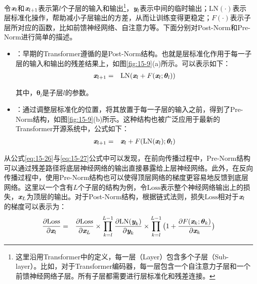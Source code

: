 \parinterval 令$\textbf{\em x}_l$和$\textbf{\em x}_{l+1}$表示第$l$个子层的输入和输出\footnote[4]{这里沿用Transformer中的定义，每一层（Layer）包含多个子层（Sub-layer）。比如，对于Transformer编码器，每一层包含一个自注意力子层和一个前馈神经网络子层。所有子层都需要进行层标准化和残差连接。}，$\textbf{\em y}_l$表示中间的临时输出；$\textrm{LN}(\cdot)$表示层标准化操作，帮助减小子层输出的方差，从而让训练变得更稳定；$F(\cdot)$表示子层所对应的函数，比如前馈神经网络、自注意力等。下面分别对Post-Norm和Pre-Norm进行简单的描述。
\begin{itemize}
\vspace{0.5em}
\item {\small{}}：早期的Transformer遵循的是Post-Norm结构。也就是层标准化作用于每一子层的输入和输出的残差结果上，如图\ref{fig:15-9}(a)所示。可以表示如下：
\begin{eqnarray}
\textbf{\em x}_{l+1} &=& \textrm{LN}(\textbf{\em x}_l+F(\textbf{\em x}_l;{\bm  \theta_l}))
\label{eq:15-26}
\end{eqnarray}

\noindent 其中，$\bm \theta_l$是子层$l$的参数。
\vspace{0.5em}
\item {\small{}}：通过调整层标准化的位置，将其放置于每一子层的输入之前，得到了Pre-Norm结构，如图\ref{fig:15-9}(b)所示。这种结构也被广泛应用于最新的Transformer开源系统中，公式如下：
\begin{eqnarray}
\textbf{\em x}_{l+1} &=& \textbf{\em x}_l+F(\textrm{LN}(\textbf{\em x}_l);{\bm  \theta_l})
\label{eq:15-27}
\end{eqnarray}
\end{itemize}

\parinterval 从公式\eqref{eq:15-26}与\eqref{eq:15-27}公式中可以发现，在前向传播过程中，Pre-Norm结构可以通过残差路径将底层神经网络的输出直接暴露给上层神经网络。此外，在反向传播过程中，使用Pre-Norm结构也可以使得顶层网络的梯度更容易地反馈到底层网络。这里以一个含有$L$个子层的结构为例，令$\textrm{Loss}$表示整个神经网络输出上的损失，$\textbf{\em x}_L$为顶层的输出。对于Post-Norm结构，根据链式法则，损失$\textrm{Loss}$相对于$\textbf{\em x}_l$ 的梯度可以表示为：
\begin{eqnarray}
\frac{\partial \textrm{Loss}}{\partial \textbf{\em x}_l} &=& \frac{\partial \textrm{Loss}}{\partial \textbf{\em x}_L} \times \prod_{k=l}^{L-1}\frac{\partial \textrm{LN}(\textbf{\em y}_k)}{\partial \textbf{\em y}_k} \times \prod_{k=l}^{L-1}\big(1+\frac{\partial F(\textbf{\em x}_k;{\bm \theta_k})}{\partial \textbf{\em x}_k} \big)
\label{eq:15-28}
\end{eqnarray}


